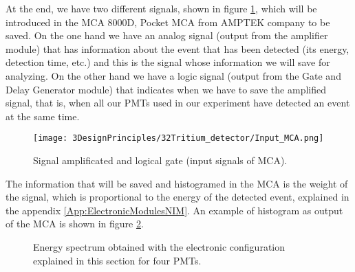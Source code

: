 At the end, we have two different signals, shown in figure \ref{fig:InputSignalsMCA}, which will be introduced in the MCA 8000D, Pocket MCA from AMPTEK company \cite{DataSheetMCA} to be saved. On the one hand we have an analog signal (output from the amplifier module) that has information about the event that has been detected (its energy, detection time, etc.) and this is the signal whose information we will save for analyzing. On the other hand we have a logic signal (output from the Gate and Delay Generator module) that indicates when we have to save the amplified signal, that is, when all our PMTs used in our experiment have detected an event at the same time.

\begin{figure}[htbp]
\centering
\texttt{[image: 3DesignPrinciples/32Tritium\_detector/Input\_MCA.png]}
\caption{Signal amplificated and logical gate (input signals of MCA).\label{fig:InputSignalsMCA}}
\end{figure}


The information that will be saved and histogramed in the MCA is the weight of the signal, which is proportional to the energy of the detected event, explained in the appendix \ref{App:ElectronicModulesNIM}. An example of histogram as output of the MCA is shown in figure \ref{fig:EnergySpectrum4PMTs}.

\begin{figure}[htbp]
\centering
\caption{Energy spectrum obtained with the electronic configuration explained in this section for four PMTs.\label{fig:EnergySpectrum4PMTs}}
\end{figure}
